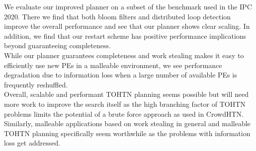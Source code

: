 \documentclass[enabledeprecatedfontcommands,12pt,a4paper,twoside]{scrartcl}
\numberwithin{equation}{section}
\begin{document}
We evaluate our improved planner on a subset of the benchmark used in the IPC 2020. There we find that both bloom filters and distributed loop detection improve the overall performance and see that our planner shows clear scaling. In addition, we find that our restart scheme has positive performance implications beyond guaranteeing completeness. \\
While our planner guarantees completeness and work stealing makes it easy to efficiently use new PEs in a malleable environment, we see performance degradation due to information loss when a large number of available PEs is frequently reshuffled. \\

Overall, scalable and performant TOHTN planning seems possible but will need more work to improve the search itself as the high branching factor of TOHTN problems limits the potential of a brute force approach as used in CrowdHTN. Similarly, malleable applications based on work stealing in general and malleable TOHTN planning specifically seem worthwhile as the problems with information loss get addressed.



\clearpage




\end{document}
